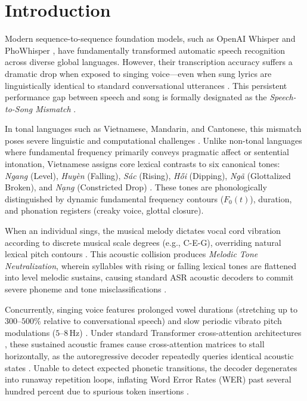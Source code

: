 \section{Introduction}
Modern sequence-to-sequence foundation models, such as OpenAI Whisper \cite{radford2023robust} and PhoWhisper \cite{phan2022phowhisper}, have fundamentally transformed automatic speech recognition across diverse global languages. However, their transcription accuracy suffers a dramatic drop when exposed to singing voice---even when sung lyrics are linguistically identical to standard conversational utterances \cite{gupta2022deep,zhuo2023lyricwhiz}. This persistent performance gap between speech and song is formally designated as the \textit{Speech-to-Song Mismatch} \cite{ou2022transfer,mesaros2010automatic}.

In tonal languages such as Vietnamese, Mandarin, and Cantonese, this mismatch poses severe linguistic and computational challenges \cite{pham2003vietnamese,nguyen1997vietnamese,wong2002how}. Unlike non-tonal languages where fundamental frequency primarily conveys pragmatic affect or sentential intonation, Vietnamese assigns core lexical contrasts to six canonical tones: \textit{Ngang} (Level), \textit{Huy\`{e}n} (Falling), \textit{S\'{a}c} (Rising), \textit{H\H{o}i} (Dipping), \textit{Ng\~{a}} (Glottalized Broken), and \textit{N\d{a}ng} (Constricted Drop) \cite{brunelle2009tone,kirby2016tone}. These tones are phonologically distinguished by dynamic fundamental frequency contours ($F_0(t)$), duration, and phonation registers (creaky voice, glottal closure). 

When an individual sings, the musical melody dictates vocal cord vibration according to discrete musical scale degrees (e.g., C-E-G), overriding natural lexical pitch contours \cite{kirby2016tone}. This acoustic collision produces \textit{Melodic Tone Neutralization}, wherein syllables with rising or falling lexical tones are flattened into level melodic sustains, causing standard ASR acoustic decoders to commit severe phoneme and tone misclassifications \cite{vu2024vietsing,hoang2026vietprism}.

Concurrently, singing voice features prolonged vowel durations (stretching up to $300\text{--}500\%$ relative to conversational speech) and slow periodic vibrato pitch modulations ($5\text{--}8$\,Hz) \cite{mesaros2010automatic,berendes2024lyrics}. Under standard Transformer cross-attention architectures \cite{vaswani2017attention,bahdanau2015neural}, these sustained acoustic frames cause cross-attention matrices to stall horizontally, as the autoregressive decoder repeatedly queries identical acoustic states \cite{cifka2024jamalt}. Unable to detect expected phonetic transitions, the decoder degenerates into runaway repetition loops, inflating Word Error Rates (WER) past several hundred percent due to spurious token insertions \cite{morris2004wer,levenshtein1966binary}.

